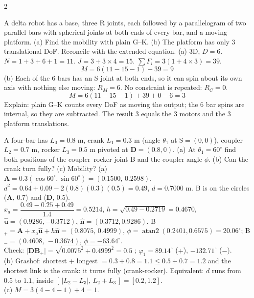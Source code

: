 \begin{multicols}{2}
\begin{examq}
A delta robot has a base, three R joints, each followed by a parallelogram of two parallel bars with spherical joints at both ends of every bar, and a moving platform. (a) Find the mobility with plain G--K. (b) The platform has only 3 translational DoF. Reconcile with the extended equation.
\solution
(a) 3D, $D=6$. $N=1+3+6+1=11$. $J=3+3\times4=15$. $\sum F_i=3(1+4\times3)=39$.
\[M=6(11-15-1)+39=\boxed{9}\]
(b) Each of the 6 bars has an S joint at both ends, so it can spin about its own axis with nothing else moving: $R_M=6$. No constraint is repeated: $R_C=0$.
\[M=6(11-15-1)+39+0-6=\boxed{3}\]
Explain: plain G--K counts every DoF as moving the output; the 6 bar spins are internal, so they are subtracted. The result 3 equals the 3 motors and the 3 platform translations.
\end{examq}

\begin{examq}
A four-bar has $L_0=0.8$ m, crank $L_1=0.3$ m (angle $\theta_1$ at {S}$=(0,0)$), coupler $L_2=0.7$ m, rocker $L_3=0.5$ m pivoted at $\mathbf D=(0.8,0)$. (a) At $\theta_1=60^\circ$ find both positions of the coupler--rocker joint B and the coupler angle $\phi$. (b) Can the crank turn fully? (c) Mobility?
\solution
(a) $\mathbf A=0.3(\cos60^\circ,\sin60^\circ)=(0.1500,\,0.2598)$. $d^2=0.64+0.09-2(0.8)(0.3)(0.5)=0.49$, $d=0.7000$ m. B is on the circles ($\mathbf A$, 0.7) and ($\mathbf D$, 0.5).\\
$x_a=\dfrac{0.49-0.25+0.49}{1.4}=0.5214$, $h=\sqrt{0.49-0.2719}=0.4670$, $\hat{\mathbf u}=(0.9286,-0.3712)$, $\hat{\mathbf n}=(0.3712,0.9286)$. B$_+=\mathbf A+x_a\hat{\mathbf u}+h\hat{\mathbf n}=\boxed{(0.8075,\,0.4999)}$, $\phi=\operatorname{atan2}(0.2401,0.6575)=20.06^\circ$; B$_-=\boxed{(0.4608,\,-0.3674)}$, $\phi=-63.64^\circ$.\\
Check: $\lvert\mathbf{DB}_+\rvert=\sqrt{0.0075^2+0.4999^2}=0.5$ \checkmark; $\varphi_1=89.14^\circ$ ($+$), $-132.71^\circ$ ($-$).\\
(b) Grashof: shortest + longest $=0.3+0.8=1.1\le0.5+0.7=1.2$ and the shortest link is the crank: it turns fully (crank-rocker). Equivalent: $d$ runs from $0.5$ to $1.1$, inside $[\,\lvert L_2-L_3\rvert,\,L_2+L_3\,]=[0.2,1.2]$.\\
(c) $M=3(4-4-1)+4=\boxed{1}$.
\end{examq}


\end{multicols}
